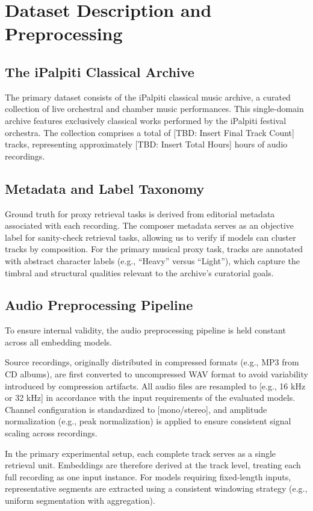 \section{Dataset Description and Preprocessing}

\subsection{The iPalpiti Classical Archive}
The primary dataset consists of the iPalpiti classical music archive, a curated collection of live orchestral and chamber music performances. This single-domain archive features exclusively classical works performed by the iPalpiti festival orchestra. The collection comprises a total of [TBD: Insert Final Track Count] tracks, representing approximately [TBD: Insert Total Hours] hours of audio recordings.

\subsection{Metadata and Label Taxonomy}
Ground truth for proxy retrieval tasks is derived from editorial metadata associated with each recording. The composer metadata serves as an objective label for sanity-check retrieval tasks, allowing us to verify if models can cluster tracks by composition. For the primary musical proxy task, tracks are annotated with abstract character labels (e.g., ``Heavy'' versus ``Light''), which capture the timbral and structural qualities relevant to the archive's curatorial goals.

\subsection{Audio Preprocessing Pipeline}

To ensure internal validity, the audio preprocessing pipeline is held constant across all embedding models.

Source recordings, originally distributed in compressed formats (e.g., MP3 from CD albums), are first converted to uncompressed WAV format to avoid variability introduced by compression artifacts. 
All audio files are resampled to [e.g., 16 kHz or 32 kHz] in accordance with the input requirements of the evaluated models. 
Channel configuration is standardized to [mono/stereo], and amplitude normalization (e.g., peak normalization) is applied to ensure consistent signal scaling across recordings.

In the primary experimental setup, each complete track serves as a single retrieval unit. 
Embeddings are therefore derived at the track level, treating each full recording as one input instance. 
For models requiring fixed-length inputs, representative segments are extracted using a consistent windowing strategy (e.g., uniform segmentation with aggregation).

